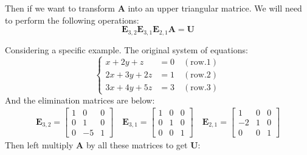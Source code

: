         Then if we want to transform \textbf{A} into an upper triangular matrice. We will need to perform the following operations:
            \begin{equation}
                \mathbf{E}_{3,2}\mathbf{E}_{3,1}\mathbf{E}_{2,1} \mathbf{A} = \mathbf{U}
            \end{equation}

        Considering a specific example. The original system of equations:
            \begin{equation}
                \left\{
                \begin{aligned}
                    x + 2y + z &= 0 \quad(\mathrm{row}.1)\\
                    2x + 3y + 2z &= 1 \quad(\mathrm{row}.2)\\
                    3x + 4y + 5z &= 3 \quad(\mathrm{row}.3)
                \end{aligned}
                \right.
            \end{equation}
        And the elimination matrices are below:
            \begin{equation}
                \begin{aligned}
                    \mathbf{E}_{3,2}=
                    \begin{bmatrix}
                        1 & 0 & 0\\
                        0 & 1 & 0\\
                        0 & -5 & 1
                    \end{bmatrix} \quad
                    \mathbf{E}_{3,1}=
                    \begin{bmatrix}
                        1 & 0 & 0\\
                        0 & 1 & 0\\
                        0 & 0 & 1
                    \end{bmatrix} \quad
                    \mathbf{E}_{2,1}=
                    \begin{bmatrix}
                        1 & 0 & 0\\
                        -2 & 1 & 0\\
                        0 & 0 & 1
                    \end{bmatrix} 
                \end{aligned}
            \end{equation}
        Then left multiply \textbf{A} by all these matrices to get \textbf{U}:
